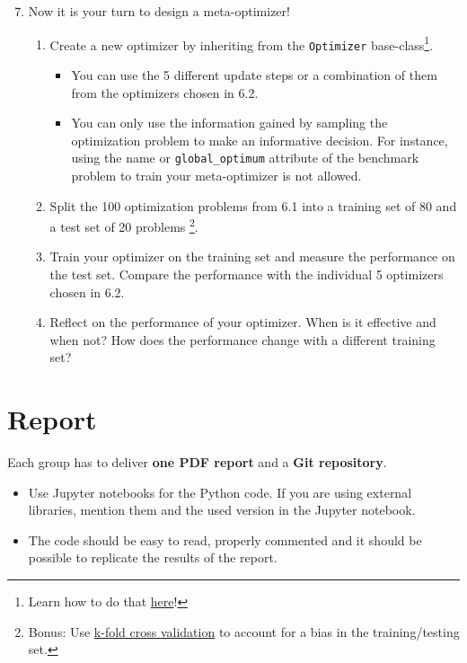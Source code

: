 \documentclass[10pt,a4paper,twoside]{article} %
\def\code#1{\texttt{#1}}
\begin{document}
\begin{enumerate}
    \setcounter{enumi}{6}
    \item Now it is your turn to design a meta-optimizer! 
    

    
    \begin{enumerate} [label*=\arabic*.]
        \item Create a new optimizer by inheriting from the \code{Optimizer} base-class\footnote{Learn how to do that \href{https://bessagroup.github.io/F3DASM/capabilities/algorithms.html\#implement-your-own-optimizer}{here}!}. 
        
        \begin{itemize}
            \item You can use the 5 different update steps or a combination of them from the optimizers chosen in 6.2.
            \item You can only use the information gained by sampling the optimization problem to make an informative decision. For instance, using the name or \code{global\_optimum} attribute of the benchmark problem to train your meta-optimizer is not allowed.
        \end{itemize}
        
        \item Split the 100 optimization problems from 6.1 into a training set of 80 and a test set of 20 problems \footnote{Bonus: Use \href{https://machinelearningmastery.com/k-fold-cross-validation/}{k-fold cross validation} to account for a bias in the training/testing set.}.
        
        \item Train your optimizer on the training set and measure the performance on the test set. Compare the performance with the individual 5 optimizers chosen in 6.2.
        
        \item Reflect on the performance of your optimizer. When is it effective and when not? How does the performance change with a different training set?
        
    \end{enumerate}
    
\end{enumerate}

\section*{Report}

Each group has to deliver \textbf{one PDF report} and a \textbf{Git repository}. 

\begin{itemize}
    \item Use Jupyter notebooks for the Python code. If you are using external libraries, mention them and the used version in the Jupyter notebook.
    
    \item The code should be easy to read, properly commented and it should be possible to replicate the results of the report.
    
\end{itemize}


{\small
	
	
}
\end{document}
